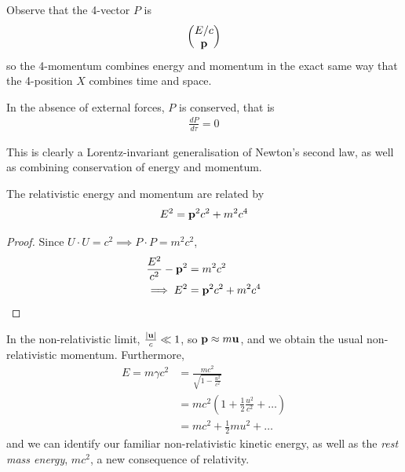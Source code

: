 \documentclass{../../template/note}
\begin{document}
    Observe that the 4-vector \(P\) is
    \begin{align*}
        \begin{pmatrix}
            E/c \\
            \V p \\
        \end{pmatrix}
    \end{align*}
    so the 4-momentum combines energy and momentum in the exact same way that the 4-position \(X\) combines time and space.

    \begin{proposition}
        In the absence of external forces, \(P\) is conserved, that is
        \begin{align*}
            \frac{dP}{d\tau} = 0
        \end{align*}
    \end{proposition}
    
    \begin{remark*}
        This is clearly a Lorentz-invariant generalisation of Newton's second law, as well as combining conservation of energy and momentum.
    \end{remark*}
    
    \begin{proposition}
        The relativistic energy and momentum are related by
        \begin{align*}
            E^2 = \V p^2 c^2 + m^2c^4
        \end{align*}
    \end{proposition}
    
    \begin{proof}
        Since \(U \cdot U = c^2 \implies P \cdot P = m^2c^2\),
        \begin{align*}
            \frac{E^2}{c^2} - \V p^2 &= m^2c^2 \\
            \implies E^2 &= \V p^2 c^2 + m^2c^4
        \end{align*}
    \end{proof}
    
    In the non-relativistic limit, \(\frac{|\V u|}{c} \ll 1\), so \(\V p \approx m \V u\), and we obtain the usual non-relativistic momentum. Furthermore,
    \begin{align*}
        E = m \gamma c^2 &= \frac{mc^2}{\sqrt{1-\frac{u^2}{c^2}}} \\
        &= mc^2 \left(1 + \frac 1 2 \frac{u^2}{c^2} + \dots\right) \\
        &= mc^2 + \frac 1 2 mu^2 + \dots
    \end{align*}
    and we can identify our familiar non-relativistic kinetic energy, as well as the \emph{rest mass energy}, \(mc^2\), a new consequence of relativity.
\end{document}
